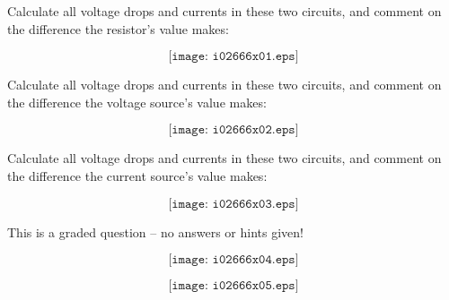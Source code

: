 

Calculate all voltage drops and currents in these two circuits, and comment on the difference the resistor's value makes:

$$\texttt{[image: i02666x01.eps]}$$

\vskip 60pt

Calculate all voltage drops and currents in these two circuits, and comment on the difference the voltage source's value makes:

$$\texttt{[image: i02666x02.eps]}$$

\vskip 60pt

Calculate all voltage drops and currents in these two circuits, and comment on the difference the current source's value makes:

$$\texttt{[image: i02666x03.eps]}$$

\vfil 

\eject






This is a graded question -- no answers or hints given!







$$\texttt{[image: i02666x04.eps]}$$

$$\texttt{[image: i02666x05.eps]}$$




